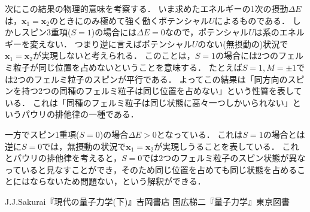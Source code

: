 \documentclass[a4paper,11pt]{jsarticle}
\begin{document}
次にこの結果の物理的意味を考察する．
いま求めたエネルギーの1次の摂動$\Delta E$は，$\bm{x}_1 = \bm{x}_2$のときにのみ極めて強く働くポテンシャル$U$によるものである．
しかしスピン3重項($S=1$)の場合には$\Delta E=0$なので，ポテンシャル$U$は系のエネルギーを変えない．
つまり逆に言えばポテンシャル$U$のない(無摂動の)状況で$\bm{x}_1=\bm{x}_2$が実現しないと考えられる．
このことは，$S=1$の場合には2つのフェルミ粒子が同じ位置を占めないということを意味する．
たとえば$S=1,M=\pm 1$では2つのフェルミ粒子のスピンが平行である．
よってこの結果は「同方向のスピンを持つ2つの同種のフェルミ粒子は同じ位置を占めない」という性質を表している．
これは「同種のフェルミ粒子は同じ状態に高々一つしかいられない」というパウリの排他律の一種である．

一方でスピン1重項($S=0$)の場合$\Delta E>0$となっている．
これは$S=1$の場合とは逆に$S=0$では，無摂動の状況で$\bm{x}_1 = \bm{x}_2$が実現しうることを表している．
これとパウリの排他律を考えると，$S=0$では2つのフェルミ粒子のスピン状態が異なっていると見なすことができ，そのため同じ位置を占めても同じ状態を占めることにはならないため問題ない，という解釈ができる．

\begin{thebibliography}{99}
    J.J.Sakurai『現代の量子力学(下)』吉岡書店
    国広梯二『量子力学』東京図書
\end{thebibliography}
\end{document}
